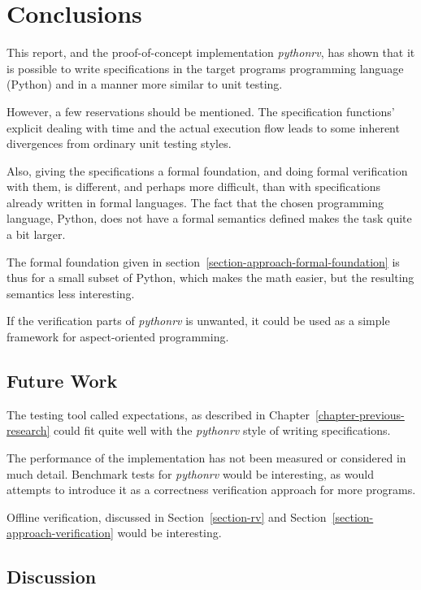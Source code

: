 \documentclass[a4paper,11pt]{kth-mag}
\begin{document}
\pagestyle{newchap}
\chapter{Conclusions} \label{chapter-conclusions}

This report, and the proof-of-concept implementation \textit{pythonrv}, has
shown that it is possible to write specifications in the target programs
programming language (Python) and in a manner more similar to unit testing.

However, a few reservations should be mentioned. The specification functions'
explicit dealing with time and the actual execution flow leads to some inherent
divergences from ordinary unit testing styles.

Also, giving the specifications a formal foundation, and doing formal
verification with them, is different, and perhaps more difficult, than with
specifications already written in formal languages. The fact that the chosen
programming language, Python, does not have a formal semantics defined makes the
task quite a bit larger.

The formal foundation given in section~\ref{section-approach-formal-foundation}
is thus for a small subset of Python, which makes the math easier, but the
resulting semantics less interesting.

If the verification parts of \textit{pythonrv} is unwanted, it could be used as
a simple framework for aspect-oriented programming.

\section{Future Work}

The testing tool called expectations, as described in
Chapter~\ref{chapter-previous-research} could fit quite well with the
\textit{pythonrv} style of writing specifications.

The performance of the implementation has not been measured or considered in
much detail. Benchmark tests for \textit{pythonrv} would be interesting, as
would attempts to introduce it as a correctness verification approach for more
programs.

Offline verification, discussed in Section~\ref{section-rv} and
Section~\ref{section-approach-verification} would be interesting.

\section{Discussion}
\end{document}
